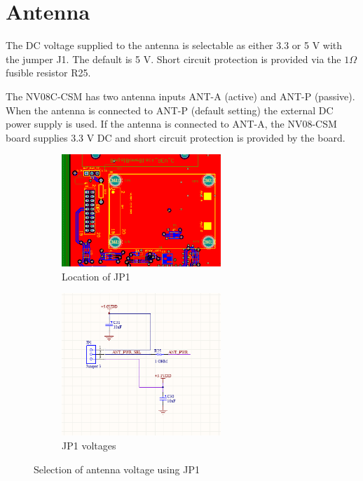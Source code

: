 
\section{Antenna} \label{sAntenna}

The DC voltage supplied to the antenna is selectable as either 3.3 or 5 V with the jumper J1. 
The default is 5 V. Short circuit protection is 
provided via the $1 \Omega$ fusible resistor R25.

The NV08C-CSM has two antenna inputs ANT-A (active) and ANT-P (passive).
When the antenna is connected to ANT-P (default setting) the external DC power supply is used.
If the antenna is connected to ANT-A, the NV08-CSM board supplies 3.3 V DC and
short circuit protection is provided by the board.


\begin{figure}

	\centering
	
	\begin{subfigure}[t]{6cm}
		\includegraphics[width=6cm]{figures/antennavselpcb.png}
		\caption{Location of JP1 }
	\end{subfigure}
	
	\quad

	\begin{subfigure}[t]{6cm}
		\includegraphics[width=6cm]{figures/antennavselcircuit.png}
		\caption{JP1 voltages}
	\end{subfigure}
	
	\caption{Selection of antenna voltage using JP1}
	
\end{figure}
